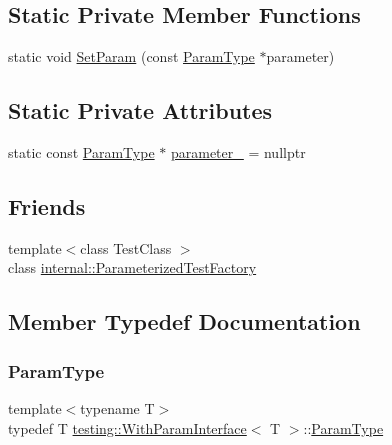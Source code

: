 \subsection*{Static Private Member Functions}
\begin{DoxyCompactItemize}
\item 
static void \hyperlink{classtesting_1_1WithParamInterface_a471e12a61e83347675b649465bc5aabc}{Set\+Param} (const \hyperlink{classtesting_1_1WithParamInterface_a343febaaebf1f025bda484f841d4fec1}{Param\+Type} $\ast$parameter)
\end{DoxyCompactItemize}
\subsection*{Static Private Attributes}
\begin{DoxyCompactItemize}
\item 
static const \hyperlink{classtesting_1_1WithParamInterface_a343febaaebf1f025bda484f841d4fec1}{Param\+Type} $\ast$ \hyperlink{classtesting_1_1WithParamInterface_ad809d968c4285b535c5c74718d40ccf0}{parameter\+\_\+} = nullptr
\end{DoxyCompactItemize}
\subsection*{Friends}
\begin{DoxyCompactItemize}
\item 
{\footnotesize template$<$class Test\+Class $>$ }\\class \hyperlink{classtesting_1_1WithParamInterface_a7543eb7df89f00fff517dba24bc11dd5}{internal\+::\+Parameterized\+Test\+Factory}
\end{DoxyCompactItemize}


\subsection{Member Typedef Documentation}
\mbox{\label{classtesting_1_1WithParamInterface_a343febaaebf1f025bda484f841d4fec1}} 
\subsubsection{\texorpdfstring{Param\+Type}{ParamType}}
{\footnotesize\ttfamily template$<$typename T$>$ \\
typedef T \hyperlink{classtesting_1_1WithParamInterface}{testing\+::\+With\+Param\+Interface}$<$ T $>$\+::\hyperlink{classtesting_1_1WithParamInterface_a343febaaebf1f025bda484f841d4fec1}{Param\+Type}}



